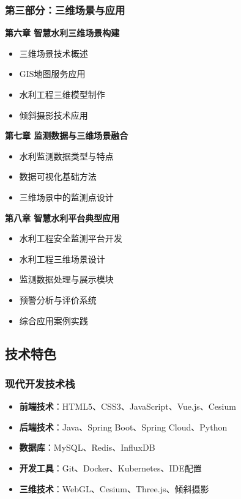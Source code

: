 \subsubsection{第三部分：三维场景与应用}\label{ux7b2cux4e09ux90e8ux5206ux4e09ux7ef4ux573aux666fux4e0eux5e94ux7528} \textbf{第六章
智慧水利三维场景构建} \begin{itemize} \tightlist \item 三维场景技术概述 \item GIS地图服务应用 \item 水利工程三维模型制作 \item 倾斜摄影技术应用 \end{itemize}
\textbf{第七章 监测数据与三维场景融合} \begin{itemize} \tightlist \item 水利监测数据类型与特点 \item 数据可视化基础方法 \item 三维场景中的监测点设计 \end{itemize}
\textbf{第八章 智慧水利平台典型应用} \begin{itemize} \tightlist \item 水利工程安全监测平台开发 \item 水利工程三维场景设计 \item 监测数据处理与展示模块 \item 预警分析与评价系统
\item 综合应用案例实践 \end{itemize} \subsection{技术特色}\label{ux6280ux672fux7279ux8272}
\subsubsection{现代开发技术栈}\label{ux73b0ux4ee3ux5f00ux53d1ux6280ux672fux6808} \begin{itemize} \tightlist \item
\textbf{前端技术}：HTML5、CSS3、JavaScript、Vue.js、Cesium \item \textbf{后端技术}：Java、Spring Boot、Spring Cloud、Python \item
\textbf{数据库}：MySQL、Redis、InfluxDB \item \textbf{开发工具}：Git、Docker、Kubernetes、IDE配置 \item
\textbf{三维技术}：WebGL、Cesium、Three.js、倾斜摄影 \end{itemize}
